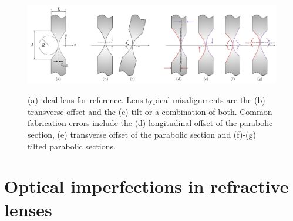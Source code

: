 \begin{refsection}
\begin{figure}[t]
    \centering
    {\includegraphics[width=1.\linewidth]{figures/ch04/lens_cuts.pdf}}
    \caption[Modelling misalignments and fabrication errors in CRLs]{(a) ideal lens for reference. Lens typical misalignments are the (b) transverse offset and the (c) tilt or a combination of both. Common fabrication errors include the (d) longitudinal offset of the parabolic section, (e) transverse offset of the parabolic section and (f)-(g) tilted parabolic sections.}
    \label{fig:lens_cuts}
\end{figure}

\section{Optical imperfections in refractive lenses}\label{sec:describing_modelling}


\end{refsection}
